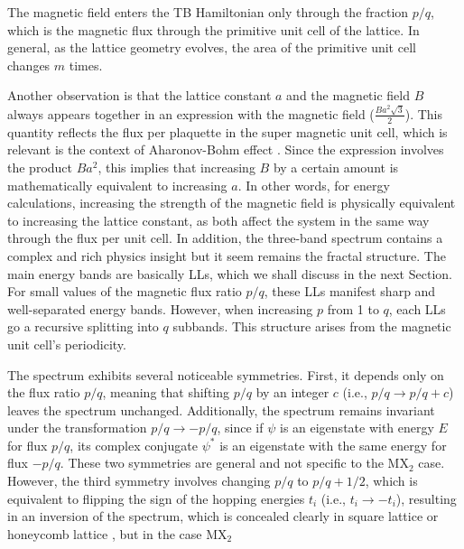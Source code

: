 \documentclass{report}
\begin{document}
\newpage
The magnetic field enters the \ac{TB} Hamiltonian only through the fraction $p/q$, which is the magnetic flux through the primitive unit cell of the lattice. In general, as the lattice geometry evolves, the area of the primitive unit cell changes $m$ times.

Another observation is that the lattice constant $a$ and the magnetic field $B$ always appears together in an expression with the magnetic field ($\tfrac{Ba^{2}\sqrt{3}}{2}$). This quantity reflects the flux per plaquette in the super magnetic unit cell, which is relevant is the context of Aharonov-Bohm effect \cite{aharonov1959}. Since the expression involves the product $Ba^{2}$, this implies that increasing $B$ by a certain amount is mathematically equivalent to increasing $a$. In other words, for energy calculations, increasing the strength of the magnetic field is physically equivalent to increasing the lattice constant, as both affect the system in the same way through the flux per unit cell. In addition, the three-band spectrum contains a complex and rich physics insight but it seem remains the fractal structure. The main energy bands are basically \ac{LLs}, which we shall discuss in the next Section. For small values of the magnetic flux ratio $p/q$, these \ac{LLs} manifest sharp and well-separated energy bands. However, when increasing $p$ from 1 to $q$, each \ac{LLs} go a recursive splitting into $q$ subbands. This structure arises from the magnetic unit cell's periodicity.

The spectrum exhibits several noticeable symmetries. First, it depends only on the flux ratio $p/q$, meaning that shifting $p/q$ by an integer $c$ (i.e., $p/q \rightarrow p/q + c$) leaves the spectrum unchanged. Additionally, the spectrum remains invariant under the transformation $p/q \rightarrow -p/q$, since if $\psi$ is an eigenstate with energy $E$ for flux $p/q$, its complex conjugate $\psi^*$ is an eigenstate with the same energy for flux $-p/q$. These two symmetries are general and not specific to the MX$_{2}$ case. However, the third symmetry involves changing $p/q$ to $p/q + 1/2$, which is equivalent to flipping the sign of the hopping energies $t_{i}$ (i.e., $t_{i} \rightarrow -t_{i}$), resulting in an inversion of the spectrum, which is concealed clearly in square lattice \cite{PhysRevB.14.2239} or honeycomb lattice \cite{rammal1985}, but in the case MX$_{2}$
\end{document}

